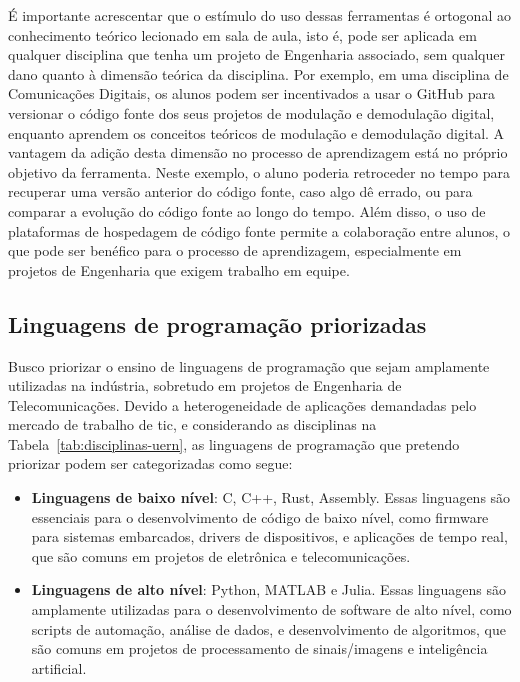 \documentclass{article}
\begin{document}
É importante acrescentar que o estímulo do uso dessas ferramentas é ortogonal ao conhecimento teórico lecionado em sala de aula, isto é, pode ser aplicada em qualquer disciplina que tenha um projeto de Engenharia associado, sem qualquer dano quanto à dimensão teórica da disciplina. Por exemplo, em uma disciplina de Comunicações Digitais, os alunos podem ser incentivados a usar o GitHub para versionar o código fonte dos seus projetos de modulação e demodulação digital, enquanto aprendem os conceitos teóricos de modulação e demodulação digital. A vantagem da adição desta dimensão no processo de aprendizagem está no próprio objetivo da ferramenta. Neste exemplo, o aluno poderia retroceder no tempo para recuperar uma versão anterior do código fonte, caso algo dê errado, ou para comparar a evolução do código fonte ao longo do tempo. Além disso, o uso de plataformas de hospedagem de código fonte permite a colaboração entre alunos, o que pode ser benéfico para o processo de aprendizagem, especialmente em projetos de Engenharia que exigem trabalho em equipe.

\subsection{Linguagens de programação priorizadas}

Busco priorizar o ensino de linguagens de programação que sejam amplamente utilizadas na indústria, sobretudo em projetos de Engenharia de Telecomunicações. Devido a heterogeneidade de aplicações demandadas pelo mercado de trabalho de \gls{tic}, e considerando as disciplinas na Tabela~\ref{tab:disciplinas-uern}, as linguagens de programação que pretendo priorizar podem ser categorizadas como segue:
\begin{itemize}
    \item \textbf{Linguagens de baixo nível}: C, C++, Rust, Assembly. Essas linguagens são essenciais para o desenvolvimento de código de baixo nível, como firmware para sistemas embarcados, drivers de dispositivos, e aplicações de tempo real, que são comuns em projetos de eletrônica e telecomunicações.
    \item \textbf{Linguagens de alto nível}: Python, MATLAB e Julia. Essas linguagens são amplamente utilizadas para o desenvolvimento de software de alto nível, como scripts de automação, análise de dados, e desenvolvimento de algoritmos, que são comuns em projetos de processamento de sinais/imagens e inteligência artificial.
\end{itemize}
\end{document}
